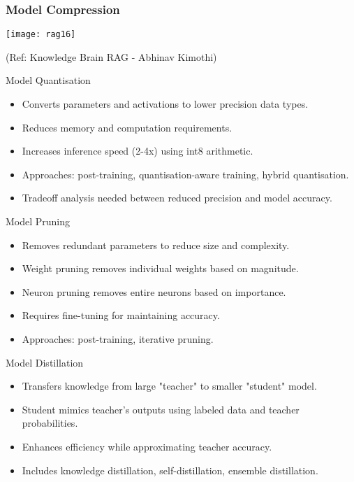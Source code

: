 \begin{frame}[fragile]\frametitle{Model Compression}


		\begin{center}
		\texttt{[image: rag16]}
		\end{center}

{\tiny (Ref: Knowledge Brain RAG - Abhinav  Kimothi)}

\end{frame}


\begin{frame}[fragile]{Model Quantisation}
  \begin{itemize}
    \item Converts parameters and activations to lower precision data types.
    \item Reduces memory and computation requirements.
    \item Increases inference speed (2-4x) using int8 arithmetic.
    \item Approaches: post-training, quantisation-aware training, hybrid quantisation.
    \item Tradeoff analysis needed between reduced precision and model accuracy.
  \end{itemize}
\end{frame}

\begin{frame}[fragile]{Model Pruning}
  \begin{itemize}
    \item Removes redundant parameters to reduce size and complexity.
    \item Weight pruning removes individual weights based on magnitude.
    \item Neuron pruning removes entire neurons based on importance.
    \item Requires fine-tuning for maintaining accuracy.
    \item Approaches: post-training, iterative pruning.
  \end{itemize}
\end{frame}

\begin{frame}[fragile]{Model Distillation}
  \begin{itemize}
    \item Transfers knowledge from large "teacher" to smaller "student" model.
    \item Student mimics teacher's outputs using labeled data and teacher probabilities.
    \item Enhances efficiency while approximating teacher accuracy.
    \item Includes knowledge distillation, self-distillation, ensemble distillation.
  \end{itemize}
\end{frame}

